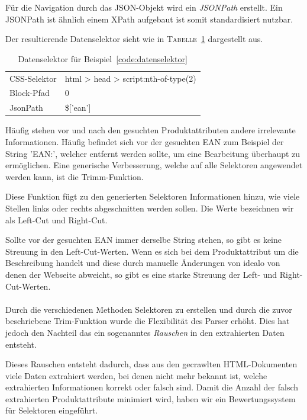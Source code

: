 Für die Navigation durch das JSON-Objekt wird ein \textit{JSONPath} erstellt.
Ein JSONPath ist ähnlich einem XPath aufgebaut ist somit standardisiert nutzbar.

Der resultierende Datenselektor sieht wie in \textsc{Tabelle}~\ref{tab:datenselektor} dargestellt aus.

\begin{table}[h]
    \centering
    \begin{tabular}{ l | l }
        CSS-Selektor &  html > head > script:nth-of-type(2)\\
        Block-Pfad   &  0 \rightarrow 1\\
        JsonPath     &  \$['ean']
    \end{tabular}
    \caption{Datenselektor für Beispiel~\ref{code:datenselektor}}
    \label{tab:datenselektor}
    \vspace{-0.5cm}
\end{table}

Häufig stehen vor und nach den gesuchten Produktattributen andere irrelevante Informationen.
Häufig befindet sich vor der gesuchten EAN zum Beispiel der String 'EAN:\textvisiblespace', welcher entfernt
werden sollte, um eine Bearbeitung überhaupt zu ermöglichen.
Eine generische Verbesserung, welche auf alle Selektoren angewendet werden kann, ist die Trimm-Funktion.

Diese Funktion fügt zu den generierten Selektoren Informationen hinzu, wie viele Stellen links oder rechts
abgeschnitten werden sollen.
Die Werte bezeichnen wir als Left-Cut und Right-Cut.

Sollte vor der gesuchten EAN immer derselbe String stehen, so gibt es keine Streuung in den Left-Cut-Werten.
Wenn es sich bei dem Produktattribut um die Beschreibung handelt und diese durch manuelle Änderungen von idealo von
denen der Webseite abweicht, so gibt es eine starke Streuung der Left- und Right-Cut-Werten.
\\
~~\\
Durch die verschiedenen Methoden Selektoren zu erstellen und durch die zuvor beschriebene Trim-Funktion wurde die
Flexibilität des Parser erhöht.
Dies hat jedoch den Nachteil das ein sogenanntes \textit{Rauschen} in den extrahierten Daten entsteht.

Dieses Rauschen entsteht dadurch, dass aus den gecrawlten HTML-Dokumenten viele Daten extrahiert werden,
bei denen nicht mehr bekannt ist, welche extrahierten Informationen korrekt oder falsch sind.
Damit die Anzahl der falsch extrahierten Produktattribute minimiert wird, haben wir ein Bewertungssystem für
Selektoren eingeführt.

